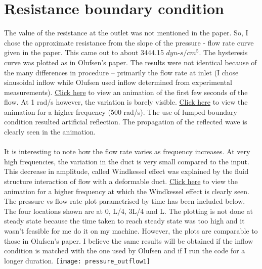 \documentclass{report}
\begin{document}
\section*{Resistance boundary condition}
The value of the resistance at the outlet was not mentioned in the paper. So, I chose the approximate resistance from the slope of the pressure - flow rate curve given in the paper. This came out to about 3444.15 $dyn$-$s/cm^5$. The hysteresis curve was plotted as in Olufsen's paper. The results were not identical because of the many differences in procedure -- primarily the flow rate at inlet (I chose sinusoidal inflow while Olufsen used inflow determined from experimental measurements). \href{run:./resistance1hz.mp4}{Click here} to view an animation of the first few seconds of the flow. At 1 rad/s however, the variation is barely visible. \href{run:./resistance500hz.mp4}{Click here} to view the animation for a higher frequency (500 rad/s). The use of lumped boundary condition resulted artificial reflection. The propagation of the reflected wave is clearly seen in the animation.\\~\\
It is interesting to note how the flow rate varies as frequency increases. At very high frequencies, the variation in the duct is very small compared to the input. This decrease in amplitude, called Windkessel effect was explained by the fluid structure interaction of flow with a deformable duct. \href{run:./resistance1000hz.mp4}{Click here} to view the animation for a higher frequency at which the Windkessel effect is clearly seen. The pressure vs flow rate plot parametrised by time has been included below. The four locations shown are at 0, L/4, 3L/4 and L. The plotting is not done at steady state because the time taken to reach steady state was too high and it wasn't feasible for me do it on my machine. However, the plots are comparable to those in Olufsen's paper. I believe the same results will be obtained if the inflow condition is matched with the one used by Olufsen and if I run the code for a longer duration.
\texttt{[image: pressure\_outflow1]}
\end{document}
